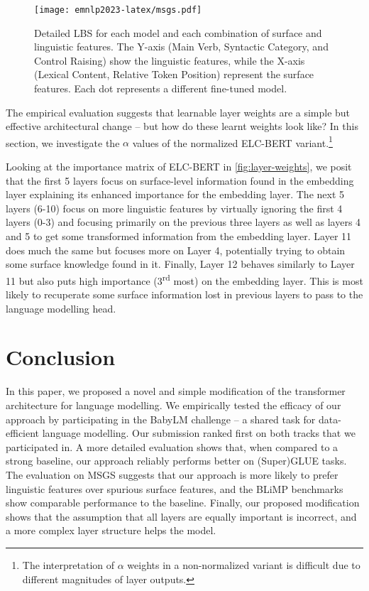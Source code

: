 \begin{figure}
    \centering
    \texttt{[image: emnlp2023-latex/msgs.pdf]}
    \caption{Detailed LBS for each model and each combination of surface and linguistic features. The Y-axis (Main Verb, Syntactic Category, and Control Raising) show the linguistic features, while the X-axis (Lexical Content, Relative Token Position) represent the surface features. Each dot represents a different fine-tuned model.}
    \label{fig:msgs}
\end{figure}

The empirical evaluation suggests that learnable layer weights are a simple but effective architectural change -- but how do these learnt weights look like? In this section, we investigate the $\alpha$ values of the normalized ELC-BERT variant.\footnote{The interpretation of $\alpha$ weights in a non-normalized variant is difficult due to different magnitudes of layer outputs.} %

Looking at the importance matrix of ELC-BERT in \cref{fig:layer-weights}, we posit that the first 5 layers focus on surface-level information found in the embedding layer explaining its enhanced importance for the embedding layer. The next 5 layers (6-10) focus on more linguistic features by virtually ignoring the first 4 layers (0-3) and focusing primarily on the previous three layers as well as layers 4 and 5 to get some transformed information from the embedding layer. Layer 11 does much the same but focuses more on Layer 4, potentially trying to obtain some surface knowledge found in it. Finally, Layer 12 behaves similarly to Layer 11 but also puts high importance (3\textsuperscript{rd} most) on the embedding layer. This is most likely to recuperate some surface information lost in previous layers to pass to the language modelling head.

\section{Conclusion}

In this paper, we proposed a novel and simple modification of the transformer architecture for language modelling. We empirically tested the efficacy of our approach by participating in the BabyLM challenge -- a shared task for data-efficient language modelling. Our submission ranked first on both tracks that we participated in. A more detailed evaluation shows that, when compared to a strong baseline, our approach reliably performs better on (Super)GLUE tasks. The evaluation on MSGS suggests that our approach is more likely to prefer linguistic features over spurious surface features, and the BLiMP benchmarks show comparable performance to the baseline. Finally, our proposed modification shows that the assumption that all layers are equally important is incorrect, and a more complex layer structure helps the model.

